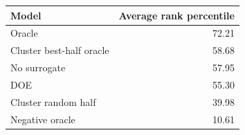 \begin{tabular}{lr}
\toprule
Model & Average rank percentile \\
\midrule
Oracle & 72.21 \\
Cluster best-half oracle & 58.68 \\
No surrogate & 57.95 \\
DOE & 55.30 \\
Cluster random half & 39.98 \\
Negative oracle & 10.61 \\
\bottomrule
\end{tabular}
